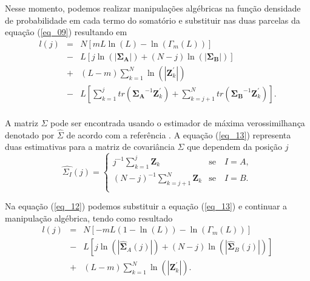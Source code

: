 \documentclass[conference]{IEEEtran}
\begin{document}
Nesse momento, podemos realizar  manipulações algébricas na função densidade de probabilidade em cada termo do somatório e substituir nas duas parcelas da equação (\ref{eq_09}) resultando em
\begin{equation}
\begin{array}{lll}\label{eq_12}
	l(j)&=&N\left[mL\ln{\left(L\right)}-\ln{\left(\Gamma_m(L)\right)}\right]\\
	&-& L\left[j\ln{\left(|\mathbf{\Sigma_{A}}|\right)}+(N-j)\ln{\left(|\mathbf{\Sigma_{B}}|\right)}\right] \\
	&+&(L-m)\sum_{k=1}^{N}\ln{\left(|\mathbf{Z}_{k}^{'}|\right)}\\
	&-&L\left[\sum_{k=1}^{j}tr(\mathbf{\Sigma_{A}}^{-1}\mathbf{Z}_{k}^{'})+ \sum_{k=j+1}^{N}tr(\mathbf{\Sigma_{B}}^{-1}\mathbf{Z}_{k}^{'})\right]. \\
\end{array}
\end{equation}

A matriz $\Sigma$ pode ser encontrada usando o estimador de máxima verossimilhança denotado por $\widehat{\Sigma}$ de acordo com a referência \cite{good}. A equação (\ref{eq_13}) representa duas estimativas para a matriz de covariância $\Sigma$ que dependem da posição $j$
\begin{equation}\label{eq_13}
\widehat{\Sigma_{I}}(j) = \left\{
\begin{array}{lc}
	j^{-1}\sum_{k=1}^{j}\mathbf{Z}_{k}  & \mbox{se}\quad I=A,  \\
        (N-j)^{-1}\sum_{k=j+1}^{N}\mathbf{Z}_{k} & \mbox{se}\quad I=B. \\
\end{array}
\right.
\end{equation}

Na equação (\ref{eq_12}) podemos substituir a equação (\ref{eq_13}) e continuar a manipulação algébrica, tendo como resultado 
\begin{equation}\label{eq_14}
\begin{array}{rcl}
	l(j)&=&N\left[-mL(1-\ln{\left(L\right)})-\ln{\left(\Gamma_m(L)\right)}\right]\\
	&-&L\left[j\ln{\left(|\mathbf{\widehat{\Sigma}}_{A}(j)|\right)} +(N-j)\ln{\left(|\mathbf{\widehat{\Sigma}}_{B}(j)|\right)}\right]\\
	&+&(L-m)\sum_{k=1}^{N}\ln{\left(|\mathbf{Z}_{k}^{'}|\right)}. \\
\end{array}
\end{equation}
\end{document}
